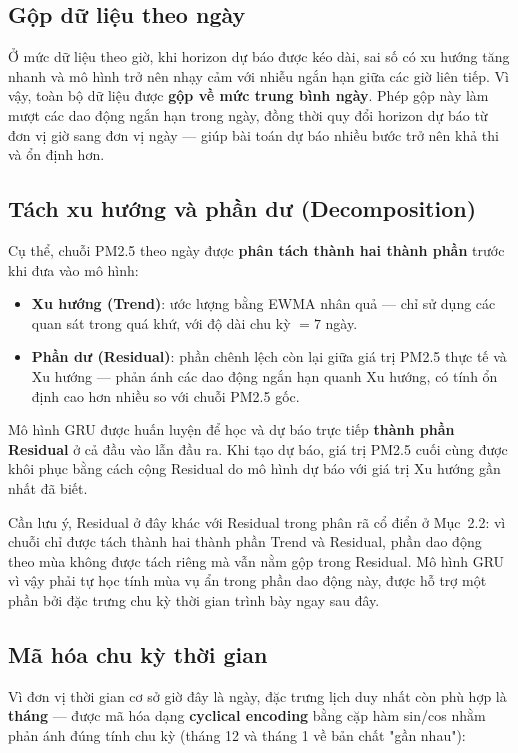 \documentclass[12pt,oneside]{report}
\begin{document}
\subsection*{Gộp dữ liệu theo ngày}

Ở mức dữ liệu theo giờ, khi horizon dự báo được kéo dài, sai số có xu hướng tăng nhanh và mô hình trở nên nhạy cảm với nhiễu ngắn hạn giữa các giờ liên tiếp. Vì vậy, toàn bộ dữ liệu được \textbf{gộp về mức trung bình ngày}. Phép gộp này làm mượt các dao động ngắn hạn trong ngày, đồng thời quy đổi horizon dự báo từ đơn vị giờ sang đơn vị ngày — giúp bài toán dự báo nhiều bước trở nên khả thi và ổn định hơn.

\subsection*{Tách xu hướng và phần dư (Decomposition)}

Cụ thể, chuỗi PM2.5 theo ngày được \textbf{phân tách thành hai thành phần} trước khi đưa vào mô hình:

\begin{itemize}
    \item \textbf{Xu hướng (Trend)}: ước lượng bằng EWMA nhân quả — chỉ sử dụng các quan sát trong quá khứ, với độ dài chu kỳ $=7$ ngày.
    \item \textbf{Phần dư (Residual)}: phần chênh lệch còn lại giữa giá trị PM2.5 thực tế và Xu hướng — phản ánh các dao động ngắn hạn quanh Xu hướng, có tính ổn định cao hơn nhiều so với chuỗi PM2.5 gốc.
\end{itemize}

Mô hình GRU được huấn luyện để học và dự báo trực tiếp \textbf{thành phần Residual} ở cả đầu vào lẫn đầu ra. Khi tạo dự báo, giá trị PM2.5 cuối cùng được khôi phục bằng cách cộng Residual do mô hình dự báo với giá trị Xu hướng gần nhất đã biết.

Cần lưu ý, Residual ở đây khác với Residual trong phân rã cổ điển ở Mục~2.2: vì chuỗi chỉ được tách thành hai thành phần Trend và Residual, phần dao động theo mùa không được tách riêng mà vẫn nằm gộp trong Residual. Mô hình GRU vì vậy phải tự học tính mùa vụ ẩn trong phần dao động này, được hỗ trợ một phần bởi đặc trưng chu kỳ thời gian trình bày ngay sau đây.

\subsection*{Mã hóa chu kỳ thời gian}

Vì đơn vị thời gian cơ sở giờ đây là ngày, đặc trưng lịch duy nhất còn phù hợp là \textbf{tháng} — được mã hóa dạng \textbf{cyclical encoding} bằng cặp hàm sin/cos nhằm phản ánh đúng tính chu kỳ (tháng 12 và tháng 1 về bản chất "gần nhau"):
\end{document}
